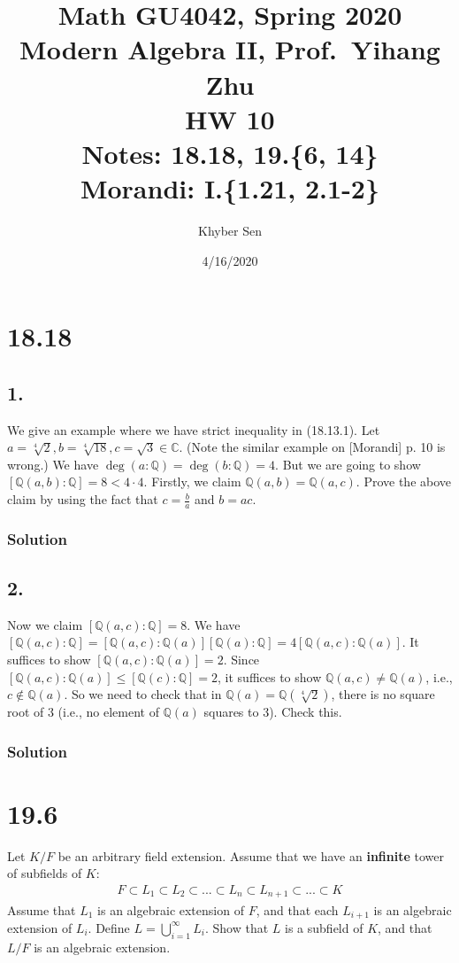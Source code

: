 \documentclass[fleqn]{article}
\title{
Math GU4042, Spring 2020 \\
Modern Algebra II, Prof.\ Yihang Zhu \\
HW 10 \\
Notes: 18.18, 19.\{6, 14\} \\
Morandi: I.\{1.21, 2.1-2\} \\
}
\author{Khyber Sen}
\date{4/16/2020}
\begin{document}
    
    \maketitle
    
    \section{18.18}
        
        \subsection{1.}
        We give an example where we have strict inequality in (18.13.1).  Let $a = \sqrt[4]{2}, b = \sqrt[4]{18}, c = \sqrt{3} \in \mathbb{C}$.  (Note the similar example on [Morandi] p. 10 is wrong.)  We have $\deg(a : \mathbb{Q}) = \deg(b : \mathbb{Q}) = 4$.  But we are going to show $[\mathbb{Q}(a, b) : \mathbb{Q}] = 8 < 4 \cdot 4$.  Firstly, we claim $\mathbb{Q}(a, b) = \mathbb{Q}(a, c)$.  Prove the above claim by using the fact that $c = \frac{b}{a}$ and $b = ac$.
            
            \subsubsection{Solution}
            
        
        \subsection{2.}
        Now we claim $[\mathbb{Q}(a, c) : \mathbb{Q}] = 8$.  We have $[\mathbb{Q}(a, c) : \mathbb{Q}] = [\mathbb{Q}(a, c) : \mathbb{Q}(a)] [\mathbb{Q}(a) : \mathbb{Q}] = 4 [\mathbb{Q}(a, c) : \mathbb{Q}(a)]$.  It suffices to show $[\mathbb{Q}(a, c) : \mathbb{Q}(a)] = 2$.  Since $[\mathbb{Q}(a, c) : \mathbb{Q}(a)] \leq [\mathbb{Q}(c) : \mathbb{Q}] = 2$, it suffices to show $\mathbb{Q}(a, c) \neq \mathbb{Q}(a)$, i.e., $c \notin \mathbb{Q}(a)$.  So we need to check that in $\mathbb{Q}(a) = \mathbb{Q}\left(\sqrt[4]{2}\right)$, there is no square root of 3 (i.e., no element of $\mathbb{Q}(a)$ squares to 3).  Check this.
            
            \subsubsection{Solution}
            
    
    \section{19.6}
    Let $K/F$ be an arbitrary field extension.  Assume that we have an \textbf{infinite} tower of subfields of $K$:
    \begin{align}
        F \subset L_1 \subset L_2 \subset ... \subset L_n \subset L_{n + 1} \subset ... \subset K
    \end{align}
    Assume that $L_1$ is an algebraic extension of $F$, and that each $L_{i + 1}$ is an algebraic extension of $L_i$.  Define $L = \bigcup\limits_{i = 1}^{\infty} L_i$.  Show that $L$ is a subfield of $K$, and that $L/F$ is an algebraic extension.
        
\end{document}
